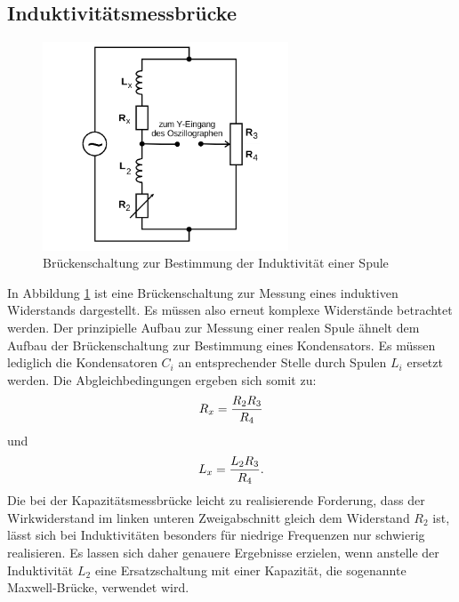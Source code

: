 \subsection{Induktivitätsmessbrücke}

\begin{figure}
  \centering
  \includegraphics[width=0.65\textwidth]{Bilder/Messbruecke_Spule_mit_R.png}
  \caption{Brückenschaltung zur Bestimmung der Induktivität einer Spule  \cite{Anleitung}}
  \label{fig:induktivitätsmessbrücke}
\end{figure}
In Abbildung \ref{fig:induktivitätsmessbrücke} ist eine Brückenschaltung zur Messung eines induktiven Widerstands dargestellt.
Es müssen also erneut komplexe Widerstände betrachtet werden. Der prinzipielle Aufbau zur Messung einer realen Spule ähnelt dem Aufbau der Brückenschaltung zur Bestimmung eines Kondensators.
Es müssen lediglich die Kondensatoren $C_i$ an entsprechender Stelle durch Spulen $L_i$ ersetzt werden.
Die Abgleichbedingungen ergeben sich somit zu:
\begin{equation}
\centering
\label{eqn:indukwiderstand}
R_x=\frac{R_2R_3}{R_4}
\end{equation}
und
\begin{equation}
\centering
\label{eqn:induktivität}
L_x=\frac{L_2R_3}{R_4}\text{.}
\end{equation}
Die bei der Kapazitätsmessbrücke leicht zu realisierende Forderung, dass der Wirkwiderstand im linken unteren Zweigabschnitt gleich dem Widerstand $R_2$ ist,
lässt sich bei Induktivitäten besonders für niedrige Frequenzen nur schwierig realisieren.
Es lassen sich daher genauere Ergebnisse erzielen, wenn anstelle der Induktivität $L_2$ eine Ersatzschaltung mit einer Kapazität, die sogenannte Maxwell-Brücke, verwendet wird.

